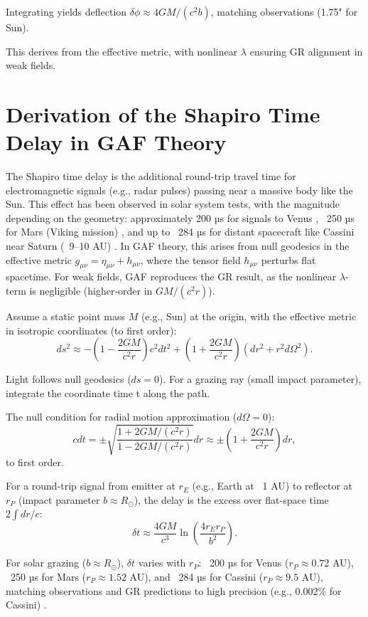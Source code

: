 \documentclass{article}
\begin{document}
Integrating yields deflection \( \delta \phi \approx 4GM/(c^2 b) \), matching observations (1.75" for Sun).

This derives from the effective metric, with nonlinear \( \lambda \) ensuring GR alignment in weak fields.

\section{Derivation of the Shapiro Time Delay in GAF Theory}

The Shapiro time delay is the additional round-trip travel time for electromagnetic signals (e.g., radar pulses) passing near a massive body like the Sun. This effect has been observed in solar system tests, with the magnitude depending on the geometry: approximately 200 µs for signals to Venus \cite{Shapiro1968}, ~250 µs for Mars (Viking mission) \cite{Reasenberg1979}, and up to ~284 µs for distant spacecraft like Cassini near Saturn (~9–10 AU) \cite{Bertotti2003}. In GAF theory, this arises from null geodesics in the effective metric \( g_{\mu\nu} = \eta_{\mu\nu} + h_{\mu\nu} \), where the tensor field \( h_{\mu\nu} \) perturbs flat spacetime. For weak fields, GAF reproduces the GR result, as the nonlinear \( \lambda \)-term is negligible (higher-order in \( GM/(c^2 r) \)).

Assume a static point mass \( M \) (e.g., Sun) at the origin, with the effective metric in isotropic coordinates (to first order):
\[
ds^2 \approx -\left(1 - \frac{2GM}{c^2 r}\right) c^2 dt^2 + \left(1 + \frac{2GM}{c^2 r}\right) (dr^2 + r^2 d\Omega^2).
\]

Light follows null geodesics (\( ds = 0 \)). For a grazing ray (small impact parameter), integrate the coordinate time t along the path.

The null condition for radial motion approximation (\( d\Omega = 0 \)):
\[
c dt = \pm \sqrt{\frac{1 + 2GM/(c^2 r)}{1 - 2GM/(c^2 r)}} dr \approx \pm \left(1 + \frac{2GM}{c^2 r}\right) dr,
\]
to first order.

For a round-trip signal from emitter at \(r_E\) (e.g., Earth at ~1 AU) to reflector at \(r_P\) (impact parameter \(b \approx R_{\odot}\)), the delay is the excess over flat-space time \( 2 \int dr / c \):
\[
\delta t \approx \frac{4GM}{c^3} \ln\left( \frac{4 r_E r_P}{b^2} \right).
\]

For solar grazing (\(b \approx R_{\odot}\)), \(\delta t\) varies with \(r_P\): ~200 µs for Venus (\(r_P \approx 0.72\) AU), ~250 µs for Mars (\(r_P \approx 1.52\) AU), and ~284 µs for Cassini (\(r_P \approx 9.5\) AU), matching observations and GR predictions to high precision (e.g., 0.002\% for Cassini) \cite{Bertotti2003}.
\end{document}
